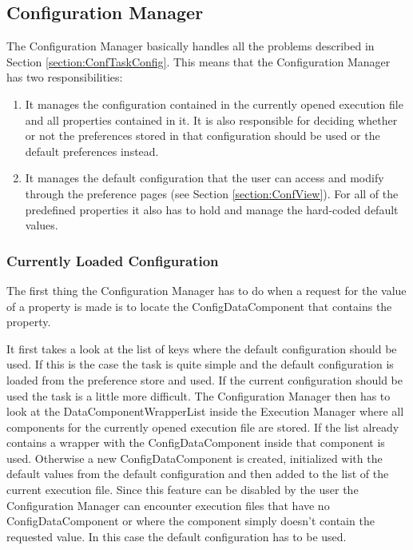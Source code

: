 \subsection{Configuration Manager}
\label{section:ConfigurationManager}
The Configuration Manager basically handles all the problems described in Section \ref{section:ConfTaskConfig}.
This means that the Configuration Manager has two responsibilities:
\begin{enumerate}
 \item It manages the configuration contained in the currently opened execution file and all properties contained in
it. It is also responsible for deciding whether or not the preferences stored in that configuration should be used
or the default preferences instead.
 \item It manages the default configuration that the user can access and modify through the preference pages 
(see Section \ref{section:ConfView}). For all of the predefined properties it also has to hold and manage the 
hard-coded default values.
\end{enumerate}

\subsubsection{Currently Loaded Configuration}
\label{section:CurrentConfiguration}
The first thing the Configuration Manager has to do when a request for the value of a property is made
is to locate the ConfigDataComponent that contains the property. 

It first takes a look at the list of keys where the default configuration should be used. If this is the case the task is quite simple
and the default configuration is loaded from the preference store and used. If the current configuration
should be used the task is a little more difficult. The Configuration Manager then has to look at the
DataComponentWrapperList inside the Execution Manager where all components for the currently opened
execution file are stored. If the list already contains a wrapper with the ConfigDataComponent inside
that component is used. Otherwise a new ConfigDataComponent is created, initialized with the default values
from the default configuration and then added to the list of the current execution file. Since this feature
can be disabled by the user the Configuration Manager can encounter execution files that have no ConfigDataComponent
or where the component simply doesn't contain the requested value. In this case the default configuration has
to be used.

